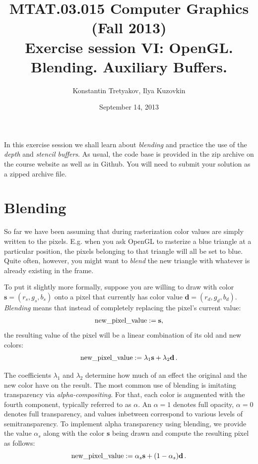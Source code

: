 \documentclass{article}
\newcommand{\bd}{\mathbf{d}}
\newcommand{\bs}{\mathbf{s}}
\begin{document}
\title{MTAT.03.015 Computer Graphics (Fall 2013)\\
Exercise session VI: OpenGL. Blending. Auxiliary Buffers.}
\author{Konstantin Tretyakov, Ilya Kuzovkin}
\date{September 14, 2013}
\maketitle

In this exercise session we shall learn about \emph{blending} and practice the use of the \emph{depth} and \emph{stencil buffers}. As usual, the code base is provided in the zip archive on the course website as well as in Github. You will need to submit your solution as a zipped archive file.

\section{Blending}
So far we have been assuming that during rasterization color values are simply written to the pixels. E.g. when you ask OpenGL to rasterize a blue triangle at a particular position, the pixels belonging to that triangle will all be set to blue. Quite often, however, you might want to \emph{blend} the new triangle with whatever is already existing in the frame. 

To put it slightly more formally, suppose you are willing to draw with color $\bs = (r_s, g_s, b_s)$ onto a pixel that currently has color value $\bd = (r_d, g_d, b_d)$. \emph{Blending} means that instead of completely replacing the pixel's current value:
$$
\text{new\textunderscore pixel\textunderscore value} := \bs,
$$
the resulting value of the pixel will be a linear combination of its old and new colors:
$$
\text{new\textunderscore pixel\textunderscore value} := \lambda_1 \bs + \lambda_2 \bd\,.
$$

The coefficients $\lambda_1$ and $\lambda_2$ determine how much of an effect the original and the new color have on the result. The most common use of blending is imitating transparency via \emph{alpha-compositing}. For that, each color is augmented with the fourth component, typically referred to as $\alpha$. An $\alpha = 1$ denotes full opacity, $\alpha = 0$ denotes full transparency, and values inbetween correspond to various levels of semitransparency. To implement alpha transparency using blending, we provide the value $\alpha_s$ along with the color $\bs$ being drawn and compute the resulting pixel as follows:
$$
\text{new\textunderscore pixel\textunderscore value} := \alpha_s \bs + (1-\alpha_s) \bd\,.
$$
\end{document}
